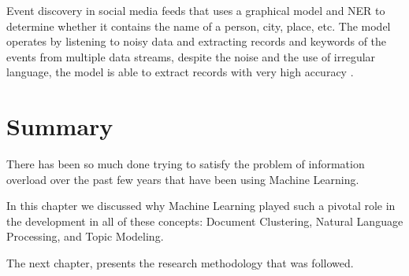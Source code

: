 Event discovery in social media feeds that uses a graphical model and NER to determine whether it contains the name of a person, city, place, etc. The model operates by listening to noisy data and extracting records and keywords of the events from multiple data streams, despite the noise and the use of irregular language, the model is able to extract records with very high accuracy \cite{benson2011event}. 

\section{Summary}
There has been so much done trying to satisfy the problem of information overload over the past few years that have been using Machine Learning.

In this chapter we discussed why Machine Learning played such a pivotal role in the development in all of these concepts: Document Clustering, Natural Language Processing, and Topic Modeling. 


The next chapter, presents the research methodology that was followed.